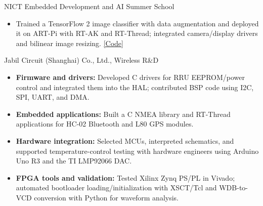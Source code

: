 
  {NICT Embedded Development and AI Summer School}
\begin{itemize}
  \item Trained a TensorFlow 2 image classifier with data augmentation and deployed it on ART-Pi with RT-AK and RT-Thread;
    integrated camera/display drivers and bilinear image resizing.
    \href{https://github.com/MarcuXu/Garbage-Classification-Device}{\textcolor{accentcolor}{[Code]}}
\end{itemize}

  {Jabil Circuit (Shanghai) Co., Ltd., Wireless R\&D}
\begin{itemize}
  \item \textbf{Firmware and drivers:} Developed C drivers for RRU EEPROM/power control and integrated them into the HAL;
    contributed BSP code using I2C, SPI, UART, and DMA.
  \item \textbf{Embedded applications:} Built a C NMEA library and RT-Thread applications for HC-02 Bluetooth and L80 GPS modules.
  \item \textbf{Hardware integration:} Selected MCUs, interpreted schematics, and supported temperature-control testing
    with hardware engineers using Arduino Uno R3 and the TI LMP92066 DAC.
  \item \textbf{FPGA tools and validation:} Tested Xilinx Zynq PS/PL in Vivado; automated bootloader loading/initialization
    with XSCT/Tcl and WDB-to-VCD conversion with Python for waveform analysis.
\end{itemize}
